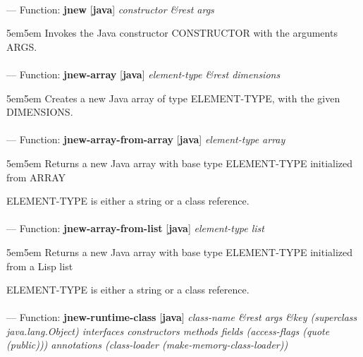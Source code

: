 \paragraph{}
\label{JAVA:JNEW}
--- Function: \textbf{jnew} [\textbf{java}] \textit{constructor \&rest args}

\begin{adjustwidth}{5em}{5em}
Invokes the Java constructor CONSTRUCTOR with the arguments ARGS.
\end{adjustwidth}

\paragraph{}
\label{JAVA:JNEW-ARRAY}
--- Function: \textbf{jnew-array} [\textbf{java}] \textit{element-type \&rest dimensions}

\begin{adjustwidth}{5em}{5em}
Creates a new Java array of type ELEMENT-TYPE, with the given DIMENSIONS.
\end{adjustwidth}

\paragraph{}
\label{JAVA:JNEW-ARRAY-FROM-ARRAY}
--- Function: \textbf{jnew-array-from-array} [\textbf{java}] \textit{element-type array}

\begin{adjustwidth}{5em}{5em}
Returns a new Java array with base type ELEMENT-TYPE initialized from ARRAY

ELEMENT-TYPE is either a string or a class reference.
\end{adjustwidth}

\paragraph{}
\label{JAVA:JNEW-ARRAY-FROM-LIST}
--- Function: \textbf{jnew-array-from-list} [\textbf{java}] \textit{element-type list}

\begin{adjustwidth}{5em}{5em}
Returns a new Java array with base type ELEMENT-TYPE initialized from a Lisp list

ELEMENT-TYPE is either a string or a class reference.
\end{adjustwidth}

\paragraph{}
\label{JAVA:JNEW-RUNTIME-CLASS}
--- Function: \textbf{jnew-runtime-class} [\textbf{java}] \textit{class-name \&rest args \&key (superclass java.lang.Object) interfaces constructors methods fields (access-flags (quote (public))) annotations (class-loader (make-memory-class-loader))}

